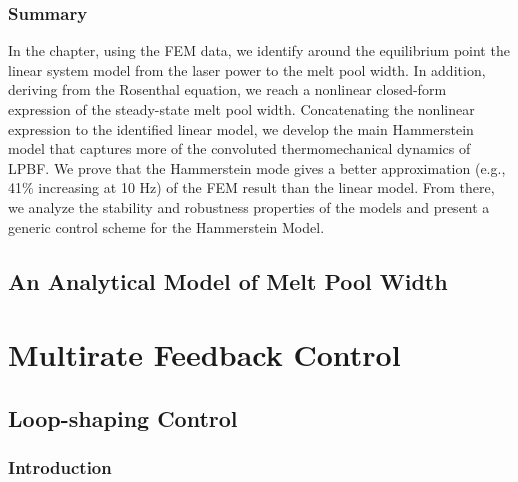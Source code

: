 \documentclass [11pt, proquest] {uwthesis}[2020/02/24]
\begin{document}
\section{\label{sec:CONCLUSION}Summary}

In the chapter, using
the FEM data, we identify around the equilibrium point the linear
system model from the laser power to the melt pool width. In addition,
deriving from the Rosenthal equation, we reach a nonlinear closed-form
expression of the steady-state melt pool width. Concatenating the
nonlinear expression to the identified linear model, we develop the
main Hammerstein model that captures more of the convoluted thermomechanical
dynamics of LPBF. We prove that the Hammerstein mode gives a better
approximation (e.g., 41\% increasing at 10 Hz) of the FEM result than
the linear model. From there, we analyze the stability and robustness
properties of the models and present a generic control scheme for
the Hammerstein Model.


\chapter{An Analytical Model of Melt Pool Width} \label{chap:Analytical-Model-MPW}


\part{Multirate Feedback Control} \label{part:Multirate-Feedback-Control}

 
\chapter{Loop-shaping Control} \label{chap:Loop-shaping-Control}

\section{Introduction}
\end{document}
